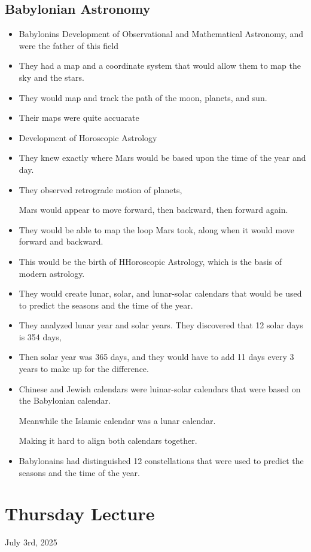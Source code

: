 \documentclass{article}
\begin{document}
\subsection{Babylonian Astronomy}
\begin{itemize}
  \item Babylonins Development of Observational and Mathematical Astronomy,
    and were the father of this field
  \item They had a map and a coordinate system
    that would allow them to map the sky and the stars.
  \item They would map and track the path of the moon, planets, and sun.
  \item Their maps were quite accuarate
  \item Development of Horoscopic Astrology
  \item They knew exactly where Mars would be based upon the time of the year
    and day.
  \item They observed retrograde motion of planets,

    Mars would appear to move forward, then backward, then forward again.
  \item They would be able to map the loop Mars took, along when it would move forward and backward.
  \item This would be the birth of HHoroscopic Astrology,
    which is the basis of modern astrology.
  \item They would create lunar, solar, and lunar-solar calendars
    that would be used to predict the seasons and the time of the year.
  \item They analyzed lunar year and solar years.
    They discovered that 12 solar days is 354 days,
  \item Then solar year was 365 days, and they would
    have to add 11 days every 3 years to make up for the difference.
  \item Chinese and Jewish calendars were luinar-solar calendars
    that were based on the Babylonian calendar.

    Meanwhile the Islamic calendar was a lunar calendar.

    Making it hard to align both calendars together.
  \item Babylonains had distinguished 12 constellations
    that were used to predict the seasons and the time of the year.
\end{itemize}

\section*{Thursday Lecture}
July 3rd, 2025
\end{document}
